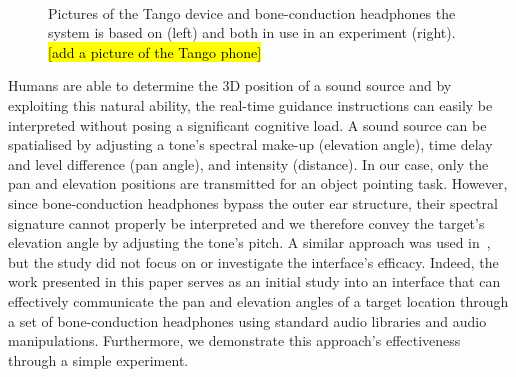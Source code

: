 \documentclass{llncs}
\DeclareRobustCommand{\tofix}[1]{{\sethlcolor{yellow}\hl{[#1]}}}
\begin{document}
\begin{figure}[t]
  \centering
~
  \caption{Pictures of the Tango device and bone-conduction headphones the system is based on (left) and both in use in an experiment (right).\tofix{add a picture of the Tango phone}}
\end{figure}

Humans are able to determine the 3D position of a sound source and by exploiting this natural ability, the real-time guidance instructions can easily be interpreted without posing a significant cognitive load.
A sound source can be spatialised by adjusting a tone's spectral make-up (elevation angle), time delay and level difference (pan angle), and intensity (distance).
In our case, only the pan and elevation positions are transmitted for an object pointing task.
However, since bone-conduction headphones bypass the outer ear structure, their spectral signature cannot properly be interpreted and we therefore convey the target's elevation angle by adjusting the tone's pitch.
A similar approach was used in~\cite{durette2008visuo}, but the study did not focus on or investigate the interface's efficacy.
Indeed, the work presented in this paper serves as an initial study into an interface that can effectively communicate the pan and elevation angles of a target location through a set of bone-conduction headphones using standard audio libraries and audio manipulations.
Furthermore, we demonstrate this approach's effectiveness through a simple experiment.
\end{document}
